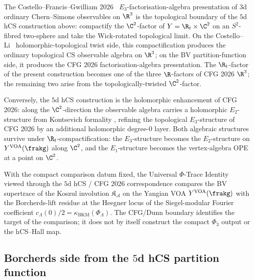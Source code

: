 \begin{remark}
\label{rem:phiutp-cfg-2026-topological-boundary}
The Costello--Francis--Gwilliam 2026~\cite{CFG2026} $E_3$-factorisation-algebra
presentation of $3$d ordinary Chern--Simons observables on $\R^3$ is
the topological boundary of the $5$d hCS construction above: compactify
the $\C^2$-factor of $Y = \R_t\times\C^2$ on an $S^2$-fibred
two-sphere and take the Wick-rotated topological limit. On the
Costello--Li~\cite{CostelloLi2020} holomorphic-topological twist side,
this compactification produces the ordinary topological CS observable
algebra on $\R^3$; on the BV partition-function side, it produces the
CFG 2026 factorisation-algebra presentation. The $\R_t$-factor of the
present construction becomes one of the three $\R$-factors of CFG 2026
$\R^3$; the remaining two arise from the topologically-twisted
$\C^2$-factor.

Conversely, the $5$d hCS construction is the holomorphic enhancement
of CFG 2026: along the $\C^2$-direction the observable algebra
carries a holomorphic $E_2$-structure from Kontsevich formality
\cite{Kontsevich1999}, refining the topological $E_3$-structure of
CFG 2026 by an additional holomorphic degree-$0$ layer. Both
algebraic structures survive under $\R_t$-compactification: the
$E_3$-structure becomes the $E_2$-structure on $Y^{\mathrm{VOA}}(\frakg)$
along $\C^2$, and the $E_1$-structure becomes the vertex-algebra
OPE at a point on $\C^2$.

With the compact comparison datum fixed, the Universal
$\Phi$-Trace Identity viewed through the $5$d hCS / CFG 2026
correspondence compares the BV supertrace of the Koszul involution
$\mathfrak{K}_{\mathcal{A}}$ on the Yangian VOA
$Y^{\mathrm{VOA}}(\frakg)$ with the Borcherds-lift residue at the
Heegner locus of the Siegel-modular Fourier coefficient
$c_\Lambda(0)/2 = \kappa_{\mathrm{BKM}}(\Phi_\Lambda)$. The
CFG/Dunn boundary identifies the target of the comparison; it does not
by itself construct the compact $\Phi_3$ output or the hCS--Hall map.
\end{remark}

\subsection{Borcherds side from the \texorpdfstring{$5$}{5}d hCS partition function}
\label{subsec:phiutp-borcherds-from-5d-hcs}

